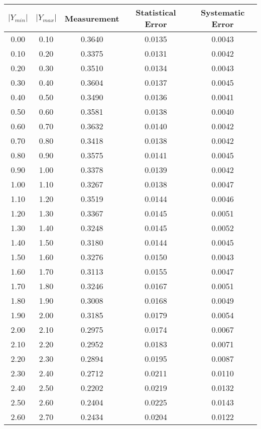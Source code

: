\begin{tabular}{|c|c||c|c|c|}
\hline
$|Y_{min}|$ & $|Y_{max}|$ & Measurement & Statistical Error & Systematic Error \\ \hline
   0.00 &    0.10 &  0.3640 &  0.0135 &  0.0043 \\ 
   0.10 &    0.20 &  0.3375 &  0.0131 &  0.0042 \\ 
   0.20 &    0.30 &  0.3510 &  0.0134 &  0.0043 \\ 
   0.30 &    0.40 &  0.3604 &  0.0137 &  0.0045 \\ 
   0.40 &    0.50 &  0.3490 &  0.0136 &  0.0041 \\ 
   0.50 &    0.60 &  0.3581 &  0.0138 &  0.0040 \\ 
   0.60 &    0.70 &  0.3632 &  0.0140 &  0.0042 \\ 
   0.70 &    0.80 &  0.3418 &  0.0138 &  0.0042 \\ 
   0.80 &    0.90 &  0.3575 &  0.0141 &  0.0045 \\ 
   0.90 &    1.00 &  0.3378 &  0.0139 &  0.0042 \\ 
   1.00 &    1.10 &  0.3267 &  0.0138 &  0.0047 \\ 
   1.10 &    1.20 &  0.3519 &  0.0144 &  0.0046 \\ 
   1.20 &    1.30 &  0.3367 &  0.0145 &  0.0051 \\ 
   1.30 &    1.40 &  0.3248 &  0.0145 &  0.0052 \\ 
   1.40 &    1.50 &  0.3180 &  0.0144 &  0.0045 \\ 
   1.50 &    1.60 &  0.3276 &  0.0150 &  0.0043 \\ 
   1.60 &    1.70 &  0.3113 &  0.0155 &  0.0047 \\ 
   1.70 &    1.80 &  0.3246 &  0.0167 &  0.0051 \\ 
   1.80 &    1.90 &  0.3008 &  0.0168 &  0.0049 \\ 
   1.90 &    2.00 &  0.3185 &  0.0179 &  0.0054 \\ 
   2.00 &    2.10 &  0.2975 &  0.0174 &  0.0067 \\ 
   2.10 &    2.20 &  0.2952 &  0.0183 &  0.0071 \\ 
   2.20 &    2.30 &  0.2894 &  0.0195 &  0.0087 \\ 
   2.30 &    2.40 &  0.2712 &  0.0211 &  0.0110 \\ 
   2.40 &    2.50 &  0.2202 &  0.0219 &  0.0132 \\ 
   2.50 &    2.60 &  0.2404 &  0.0225 &  0.0143 \\ 
   2.60 &    2.70 &  0.2434 &  0.0204 &  0.0122 \\ 

\end{tabular}
